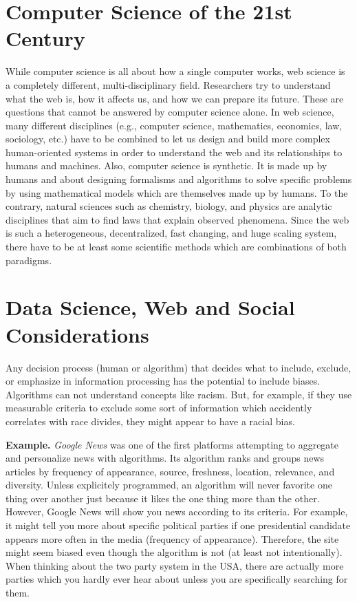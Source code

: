 \documentclass[a4paper]{article}
\begin{document}
\section{Computer Science of the 21st Century}
While computer science is all about how a single computer works, web science is a completely different, multi-disciplinary field.
Researchers try to understand what the web is, how it affects us, and how we can prepare its future.
These are questions that cannot be answered by computer science alone.
In web science, many different disciplines (e.g., computer science, mathematics, economics, law, sociology, etc.) have to be combined to let us design and build more complex human-oriented systems in order to understand the web and its relationships to humans and machines.
Also, computer science is synthetic.
It is made up by humans and about designing formalisms and algorithms to solve specific problems by using mathematical models which are themselves made up by humans.
To the contrary, natural sciences such as chemistry, biology, and physics are analytic disciplines that aim to find laws that explain observed phenomena.
Since the web is such a heterogeneous, decentralized, fast changing, and huge scaling system, there have to be at least some scientific methods which are combinations of both paradigms.

\section{Data Science, Web and Social Considerations}
Any decision process (human or algorithm) that decides what to include, exclude, or emphasize in information processing has the potential to include biases.
Algorithms can not understand concepts like racism.
But, for example, if they use measurable criteria to exclude some sort of information which accidently correlates with race divides, they might appear to have a racial bias.

\textbf{Example.} \emph{Google News} was one of the first platforms attempting to aggregate and personalize news with algorithms.
Its algorithm ranks and groups news articles by frequency of appearance, source, freshness, location, relevance, and diversity.
Unless explicitely programmed, an algorithm will never favorite one thing over another just because it likes the one thing more than the other.
However, Google News will show you news according to its criteria.
For example, it might tell you more about specific political parties if one presidential candidate appears more often in the media (frequency of appearance).
Therefore, the site might seem biased even though the algorithm is not (at least not intentionally).
When thinking about the two party system in the USA, there are actually more parties which you hardly ever hear about unless you are specifically searching for them.
\end{document}
